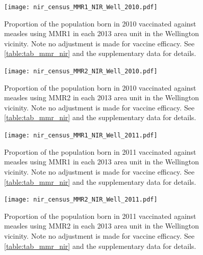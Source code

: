 \documentclass{article}
\begin{document}
\begin{figure}
\begin{center}
    \texttt{[image: nir\_census\_MMR1\_NIR\_Well\_2010.pdf]}
\end{center}
    \caption{Proportion of the population born in 2010 vaccinated against measles using MMR1 in each 2013 area unit in the Wellington vicinity. Note no adjustment is made for vaccine efficacy. See \autoref{table:tab_mmr_nir} and the supplementary data for details.}
\label{fig:fig12010_w}
\end{figure}


\begin{figure}
\begin{center}
    \texttt{[image: nir\_census\_MMR2\_NIR\_Well\_2010.pdf]}
 \end{center}
    \caption{Proportion of the population born in 2010 vaccinated against measles using MMR2 in each 2013 area unit in the Wellington vicinity. Note no adjustment is made for vaccine efficacy. See \autoref{table:tab_mmr_nir} and the supplementary data for details.}
\label{fig:fig22010_w}
\end{figure}


\begin{figure}
\begin{center}
    \texttt{[image: nir\_census\_MMR1\_NIR\_Well\_2011.pdf]}
 \end{center}
    \caption{Proportion of the population born in 2011 vaccinated against measles using MMR1 in each 2013 area unit in the Wellington vicinity. Note no adjustment is made for vaccine efficacy. See \autoref{table:tab_mmr_nir} and the supplementary data for details.}
\label{fig:fig12011_w}
\end{figure}


\begin{figure}
\begin{center}
    \texttt{[image: nir\_census\_MMR2\_NIR\_Well\_2011.pdf]}
 \end{center}
    \caption{Proportion of the population born in 2011 vaccinated against measles using MMR2 in each 2013 area unit in the Wellington vicinity. Note no adjustment is made for vaccine efficacy. See \autoref{table:tab_mmr_nir} and the supplementary data for details.}
\label{fig:fig22011_w}
\end{figure}
\end{document}
